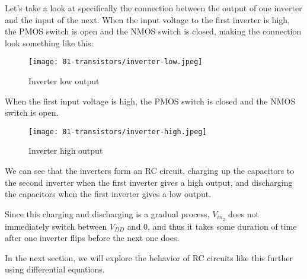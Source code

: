 \documentclass[11pt]{article}
\begin{document}
Let's take a look at specifically the connection between the output of one inverter and the input of the next. When the input voltage to the first inverter is high, the PMOS switch is open and the NMOS switch is closed, making the connection look something like this:

\begin{figure}[H]
    \centering
        \texttt{[image: 01-transistors/inverter-low.jpeg]}
    \caption{Inverter low output}
\end{figure}

When the first input voltage is high, the PMOS switch is closed and the NMOS switch is open.

\begin{figure}[H]
    \centering
        \texttt{[image: 01-transistors/inverter-high.jpeg]}
    \caption{Inverter high output}
\end{figure}

We can see that the inverters form an RC circuit, charging up the capacitors to the second inverter when the first inverter gives a high output, and discharging the capacitors when the first inverter gives a low output. 

Since this charging and discharging is a gradual process, $V_{in_2}$ does not immediately switch between $V_{DD}$ and $0$, and thus it takes some duration of time after one inverter flips before the next one does.

In the next section, we will explore the behavior of RC circuits like this further using differential equations. 
\end{document}
